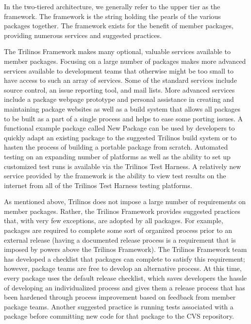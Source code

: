\documentclass[12pt,relax]{article}
\begin{document}
  In the two-tiered architecture, we generally refer to the upper tier as the
  framework.  The framework is the string holding the pearls of the various
  packages together.  The framework exists for the benefit of member
  packages, providing numerous services and suggested practices.

  The Trilinos Framework makes many optional, valuable services available to
  member packages.  Focusing on a large number of packages makes more advanced
  services available to development teams that otherwise might be too
  small to have access to such an array of services.  Some of the standard
  services include source control, an issue reporting tool, and mail lists.
  More advanced services include a package webpage prototype and personal 
  assistance in creating and maintaining package websites as well as a build 
  system that allows all packages to be built as a part of a single process 
  and helps to ease some porting issues.  A functional example package called
  New Package can be used by developers to quickly adapt an existing package 
  to the suggested Trilinos build system or to hasten the process of 
  building a portable package from scratch.  Automated testing on an expanding 
  number of platforms as well as the ability to set up customized test runs is 
  available via the Trilinos Test Harness.  A relatively new service provided 
  by  the framework is the ability to view test results on the internet from
  all of the Trilinos Test Harness testing platforms.
  
  As mentioned above, Trilinos does not impose a large number of requirements
  on member packages.  Rather, the Trilinos Framework provides suggested 
  practices that, with very few exceptions, are adopted by all packages.
  For example, packages are required to complete some sort of organized
  process prior to an external release (having a documented release
  process is a requirement that is imposed by powers above the Trilinos
  Framework).  The Trilinos Framework team has developed a checklist that
  packages can complete to satisfy this requirement; however, package teams
  are free to develop an alternative process.  At this time, every package
  uses the default release checklist, which saves developers the hassle of
  developing an individualized process and gives them a release process that
  has been hardened through process improvement based on feedback from
  member package teams.  Another suggested practice is running tests
  associated with a package before committing new code for that package to the 
  CVS repository.
\end{document}

